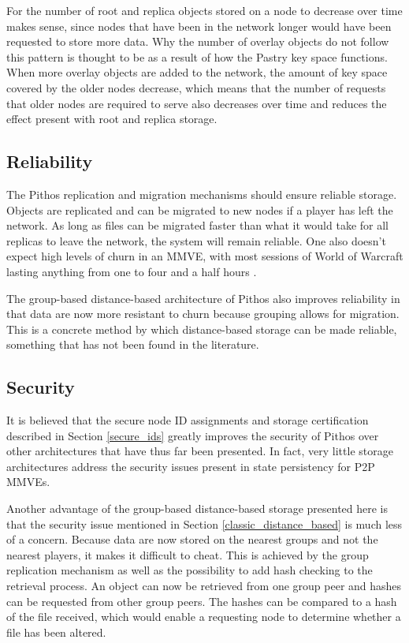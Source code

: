 \documentclass[10pt,a4paper,conference]{IEEEtran}
\begin{document}
For the number of root and replica objects stored on a node to decrease over time makes sense, since nodes that have been in the network longer would
have been requested to store more data. Why the number of overlay objects do not follow this pattern is thought to be as a result of how the Pastry
key space functions. When more overlay objects are added to the network, the amount of key space covered by the older nodes decrease, which means
that the number of requests that older nodes are required to serve also decreases over time and reduces the effect present with root and replica
storage.

\subsection{Reliability}

The Pithos replication and migration mechanisms should ensure reliable storage. Objects are replicated and can be migrated to new nodes if a player
has left the network. As long as files can be migrated faster than what it would take for all replicas to leave the network, the system will remain
reliable. One also doesn't expect high levels of churn in an MMVE, with most sessions of World of Warcraft lasting anything from one to four and a
half hours \cite{wow_gameplay_hours}.

The group-based distance-based architecture of Pithos also improves reliability in that data are now more resistant to churn because grouping allows
for migration. This is a concrete method by which distance-based storage can be made reliable, something that has not been found in the literature.

\subsection{Security}

It is believed that the secure node ID assignments and storage certification described in Section \ref{secure_ids} greatly improves the security of
Pithos over other architectures that have thus far been presented. In fact, very little storage architectures address the security issues present in
state persistency for P2P MMVEs.

Another advantage of the group-based distance-based storage presented here is that the security issue mentioned in Section
\ref{classic_distance_based} is much less of a concern. Because data are now stored on the nearest groups and not the nearest players, it makes it
difficult to cheat. This is achieved by the group replication mechanism as well as the possibility to add hash checking to the retrieval process. An
object can now be retrieved from one group peer and hashes can be requested from other group peers. The hashes can be compared to a hash of the file
received, which would enable a requesting node to determine whether a file has been altered.
\end{document}
